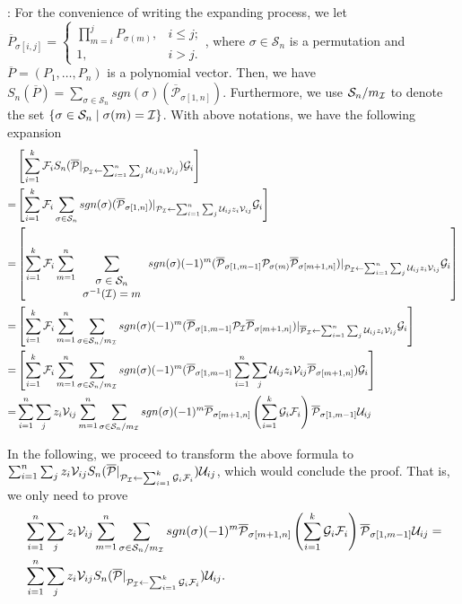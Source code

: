 \documentclass[12pt,reqno]{article}
\newenvironment{proof}{\QuadSpace\par\noindent{\bf Proof}:}{\EndProof\HalfSpace}
\newcommand{\QuadSpace}{\vspace{0.25\baselineskip}}
\newcommand{\HalfSpace}{\vspace{0.5\baselineskip}}
\newcommand{\EndProof}{ \hfill \vrule width 1ex height 1ex depth 0pt }
\newcommand{\set}[1]{\left\{#1\right\}}
\newcommand{\nx}[1]{#1_1,\ldots,#1_{n}}
\renewcommand{\t}[1]{\overline{#1}}
\newcommand{\anbra}[1]{\ensuremath{\left[ #1\right]}}
\newcommand{\s}{\sigma}
\renewcommand{\S}{\mathcal{S}}
\newcommand\ii{{\cal I}}
\newcommand{\U}{\mathcal U_{ij}}
\newcommand{\V}{\mathcal V_{ij}}
\newcommand{\uzv}{\sum_{i=1}^n\sum_{j}\U z_i\V}
\begin{document}
\begin{proof}
For the convenience of writing the expanding process, 
	we let
	$\t P_{\s[i,j]}=\left\{
	\begin{array}{ll}
	\prod_{m=i}^j P_{\s(m)}, & i\leq j; \\
	 1, & i>j.
	\end{array}\right. $, 
	where  $\s\in \S_n$ is a permutation and $\t P= (\nx{P})$ is a polynomial vector. 
Then, we have $S_n(\t P)= \sum_{\s \in \S_{n} }sgn(\s)(\t{\mathcal P}_{\s[1,n]})$. 
Furthermore, we use $\S_n/m_\ii$  to denote the set $\set{\s\in \S_n\;|\;\s(m)=\ii}$.
With above notations, we have the following expansion 
\begin{align*}
&\anbra{\sum_{i=1}^k\mathcal {F}_i  S_{n}(\t{\mathcal P}|_{\mathcal P _\ii\leftarrow \uzv})\mathcal {G}_i }\\
=&\anbra{\sum_{i=1}^k \mathcal {F}_i   \sum_{\s \in \S_{n} }sgn(\s)(\t{\mathcal P}_{\s[1,n]})|_{ \mathcal P _\ii\leftarrow \uzv} \mathcal {G}_i }\\
=&\anbra{\sum_{i=1}^k \mathcal {F}_i  \sum_{m=1}^{n} \sum_{\begin{array}{c}
		\s \in \S_{n} \\
		\s^{-1}(\ii)=m
		\end{array}}sgn(\sigma)(-1)^m(\t{\mathcal P}_{\s[1,m-1]}\mathcal P_{\s(m)} \t{\mathcal P}_{\s[m+1,n]})|_{\mathcal P _\ii\leftarrow \uzv}\mathcal {G}_i } \\
=&\anbra{\sum_{i=1}^k \mathcal {F}_i  \sum_{m=1}^{n} \sum_{\s\in \S_n/m_\ii} sgn(\s)(-1)^m(\t{\mathcal P}_{\s[1,m-1]} \mathcal P _\ii \t{\mathcal P}_{\s[m+1,n]})|_{\overline{ \mathcal P }_\ii\leftarrow \uzv}\mathcal {G}_i } \\
=&\anbra{\sum_{i=1}^k \mathcal {F}_i  \sum_{m=1}^{n} \sum_{\s\in \S_n/m_\ii}sgn(\s)(-1)^m(\t{\mathcal P}_{\s[1,m-1]}\uzv \t{\mathcal P}_{\s[m+1,n]})\mathcal {G}_i } \\
=& \sum_{i=1}^n\sum_j z_i \V\sum_{m=1}^{n} \sum_{\s\in \S_n/m_\ii}sgn(\s)(-1)^m \t{\mathcal P}_{\s[m+1,n]}\left(\sum_{i=1}^k\mathcal {G}_i \mathcal {F}_i\right) \t{\mathcal P}_{\s[1,m-1]} \U\\
\end{align*} 

In the following, we proceed to transform the above formula to $ \sum_{i=1}^n \sum_j z_i \V S_{n}(\t{\mathcal P}|_{ \mathcal P _\ii\leftarrow 
	\sum_{i=1}^k\mathcal {G}_i \mathcal {F}_i})\U$, which would conclude the proof. 
That is, we only need to prove 
	\begin{align*}
&\sum_{i=1}^n\sum_j z_i \V\sum_{m=1}^{n} \sum_{\s\in \S_n/m_\ii}sgn(\s)(-1)^m \t{\mathcal P}_{\s[m+1,n]}\left(\sum_{i=1}^k\mathcal {G}_i \mathcal {F}_i\right) \t{\mathcal P}_{\s[1,m-1]} \U=\\
&\sum_{i=1}^n \sum_j z_i \V S_{n}(\t{\mathcal P}|_{ \mathcal P _\ii\leftarrow 
	\sum_{i=1}^k\mathcal {G}_i \mathcal {F}_i})\U.
	\end{align*} 


\end{proof}
\end{document}
